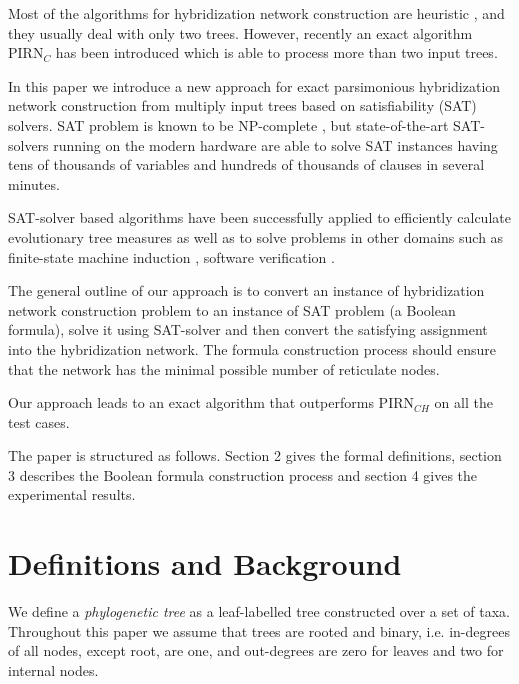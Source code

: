 \documentclass[runningheads, envcountsame, a4paper]{llncs}
\begin{document}
Most of the algorithms for hybridization network construction are heuristic \cite{wu2013algorithm}, \cite{park2012murpar} 
and they usually deal with only two trees.
However, recently an exact algorithm PIRN$_C$ has been introduced \cite{wu2013algorithm} which is able to process more than two input trees.

In this paper we introduce a new approach for exact parsimonious
hybridization network construction from multiply input trees based on satisfiability (SAT) solvers.
SAT problem is known to be NP-complete \cite{bordewich2007computing}, but state-of-the-art SAT-solvers running on the modern hardware 
are able to solve SAT instances having tens of thousands of variables and hundreds of thousands of clauses in several minutes.

SAT-solver based algorithms have been successfully applied to efficiently calculate evolutionary tree measures \cite{bonet2009efficiently}
as well as to solve problems in other domains such as
finite-state machine induction \cite{heule2010exact}, software verification \cite{}.

The general outline of our approach is to convert an instance of hybridization network construction 
problem to an instance of SAT problem (a Boolean formula), solve it using SAT-solver and then convert 
the satisfying assignment into the hybridization network. The formula construction process should ensure that
the network has the minimal possible number of reticulate nodes.

Our approach leads to an exact algorithm that outperforms PIRN$_{CH}$ on all the test cases.

The paper is structured as follows. Section 2 gives the formal definitions, section 3 describes the Boolean formula
construction process and section 4 gives the experimental results.

\section{Definitions and Background}

We define a \emph{phylogenetic tree} as a leaf-labelled tree constructed over a set of taxa. 
Throughout this paper we assume that trees are rooted and binary, i.e. in-degrees of all nodes, except root, are one, 
and out-degrees are zero for leaves and two for internal nodes. 
\end{document}
